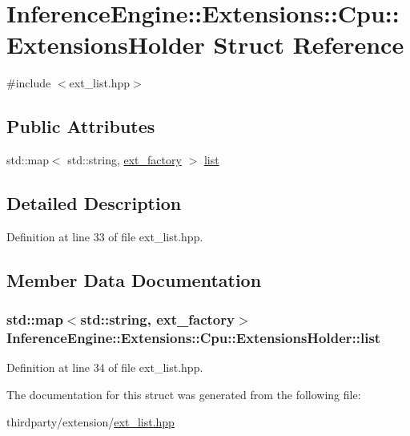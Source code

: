 \hypertarget{structInferenceEngine_1_1Extensions_1_1Cpu_1_1ExtensionsHolder}{}\section{Inference\+Engine\+:\+:Extensions\+:\+:Cpu\+:\+:Extensions\+Holder Struct Reference}
\label{structInferenceEngine_1_1Extensions_1_1Cpu_1_1ExtensionsHolder}


{\ttfamily \#include $<$ext\+\_\+list.\+hpp$>$}

\subsection*{Public Attributes}
\begin{DoxyCompactItemize}
\item 
std\+::map$<$ std\+::string, \hyperlink{namespaceInferenceEngine_1_1Extensions_1_1Cpu_af4abba10662fceb8a076b617209801ed}{ext\+\_\+factory} $>$ \hyperlink{structInferenceEngine_1_1Extensions_1_1Cpu_1_1ExtensionsHolder_a169af915f746c7a77f5b02d5ef4b81be}{list}
\end{DoxyCompactItemize}


\subsection{Detailed Description}


Definition at line 33 of file ext\+\_\+list.\+hpp.



\subsection{Member Data Documentation}
\subsubsection[{\texorpdfstring{list}{list}}]{\setlength{\rightskip}{0pt plus 5cm}std\+::map$<$std\+::string, {\bf ext\+\_\+factory}$>$ Inference\+Engine\+::\+Extensions\+::\+Cpu\+::\+Extensions\+Holder\+::list}\hypertarget{structInferenceEngine_1_1Extensions_1_1Cpu_1_1ExtensionsHolder_a169af915f746c7a77f5b02d5ef4b81be}{}\label{structInferenceEngine_1_1Extensions_1_1Cpu_1_1ExtensionsHolder_a169af915f746c7a77f5b02d5ef4b81be}


Definition at line 34 of file ext\+\_\+list.\+hpp.



The documentation for this struct was generated from the following file\+:\begin{DoxyCompactItemize}
\item 
thirdparty/extension/\hyperlink{ext__list_8hpp}{ext\+\_\+list.\+hpp}\end{DoxyCompactItemize}
